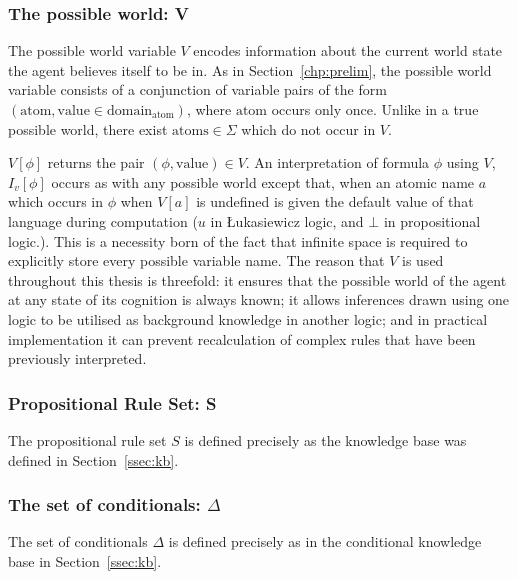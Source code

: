 \subsubsection*{The possible world: V}
The possible world variable $V$ encodes information about the current world state the agent believes itself to be in. As in Section~\ref{chp:prelim}, the possible world variable consists of a conjunction of variable pairs of the form $(\textrm{atom},\textrm{value}\in\textrm{domain}_\textrm{atom})$, where $\textrm{atom}$ occurs only once. Unlike in a true possible world, there exist $\textrm{atoms} \in \Sigma$ which do not occur in $V$.

$V[\phi]$ returns the pair $(\phi,\textrm{value}) \in V$. An interpretation of formula $\phi$ using $V$, $I_v[\phi]$ occurs as with any possible world except that, when an atomic name $a$ which occurs in $\phi$ when $V[a]$ is undefined is given the default value of that language during computation ($u$ in \L ukasiewicz logic, and $\bot$ in propositional logic.). This is a necessity born of the fact that infinite space is required to explicitly store every possible variable name. The reason that $V$ is used throughout this thesis is threefold: it ensures that the possible world of the agent at any state of its cognition is always known; it allows inferences drawn using one logic to be utilised as background knowledge in another logic; and in practical implementation it can prevent recalculation of complex rules that have been previously interpreted.

\subsubsection*{Propositional Rule Set: S}
The propositional rule set $S$ is defined precisely as the knowledge base was defined in Section~\ref{ssec:kb}.

\subsubsection*{The set of conditionals: $\Delta$}
The set of conditionals $\Delta$ is defined precisely as in the conditional knowledge base in Section~\ref{ssec:kb}.

